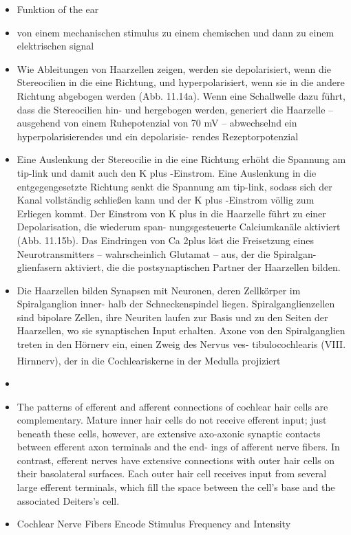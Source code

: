 \documentclass[12pt,a4paper,pdftex]{article}
\begin{document}
\begin{itemize}
    \item Funktion of the ear
    \item von einem mechanischen stimulus zu einem chemischen und dann zu einem elektrischen signal
    \item Wie Ableitungen von Haarzellen zeigen, werden sie depolarisiert,
    wenn die Stereocilien in die eine Richtung, und hyperpolarisiert, wenn sie in die andere
    Richtung abgebogen werden (Abb. 11.14a). Wenn eine Schallwelle dazu führt, dass die
    Stereocilien hin- und hergebogen werden, generiert die Haarzelle – ausgehend von einem
    Ruhepotenzial von 70 mV – abwechselnd ein hyperpolarisierendes und ein depolarisie-
    rendes Rezeptorpotenzial
    \item Eine Auslenkung der Stereocilie in die
    eine Richtung erhöht die Spannung am tip-link und damit auch den K plus -Einstrom. Eine
    Auslenkung in die entgegengesetzte Richtung senkt die Spannung am tip-link, sodass sich
    der Kanal vollständig schließen kann und der K plus -Einstrom völlig zum Erliegen kommt.
    Der Einstrom von K plus in die Haarzelle führt zu einer Depolarisation, die wiederum span-
    nungsgesteuerte Calciumkanäle aktiviert (Abb. 11.15b). Das Eindringen von Ca 2plus löst die
    Freisetzung eines Neurotransmitters – wahrscheinlich Glutamat – aus, der die Spiralgan-
    glienfasern aktiviert, die die postsynaptischen Partner der Haarzellen bilden.
    \item Die Haarzellen bilden Synapsen mit Neuronen, deren Zellkörper im Spiralganglion inner-
    halb der Schneckenspindel liegen. Spiralganglienzellen sind bipolare Zellen, ihre Neuriten
    laufen zur Basis und zu den Seiten der Haarzellen, wo sie synaptischen Input erhalten.
    Axone von den Spiralganglien treten in den Hörnerv ein, einen Zweig des Nervus ves-
    tibulocochlearis (VIII. Hirnnerv), der in die Cochleariskerne in der Medulla projiziert\textsuperscript{\cite[11]{neurowissenschaften_baer}}
    \item
    \item The patterns of efferent and afferent connections
    of cochlear hair cells are complementary. Mature inner
    hair cells do not receive efferent input; just beneath
    these cells, however, are extensive axo-axonic synaptic
    contacts between efferent axon terminals and the end-
    ings of afferent nerve fibers. In contrast, efferent nerves
    have extensive connections with outer hair cells on their
    basolateral surfaces. Each outer hair cell receives input
    from several large efferent terminals, which fill the space
    between the cell’s base and the associated Deiters’s cell.
    \item Cochlear Nerve Fibers Encode Stimulus Frequency
    and Intensity
    \end{itemize}
\end{document}
